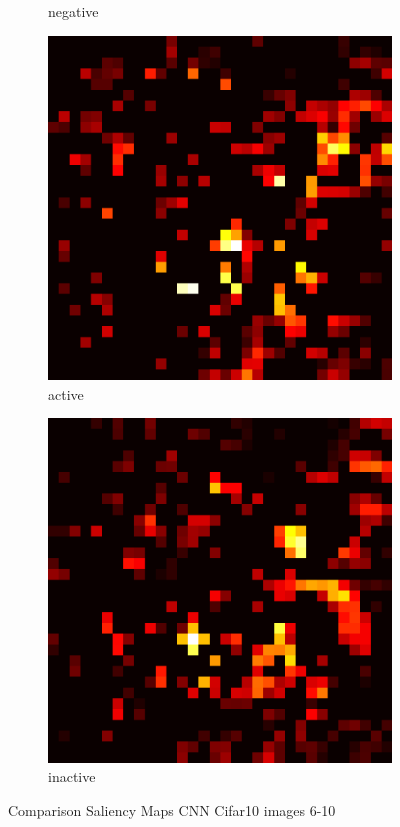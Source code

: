 \documentclass[preprint,12pt]{elsarticle}
\begin{document}
\begin{figure}
\begin{subfigure}{0.14\textwidth}
        \caption{negative}
    \end{subfigure}
    \hfill
    \begin{subfigure}{0.14\textwidth}
        \centering
        \includegraphics[width=\linewidth]{../visualizations/examples/cifar10/cnn/active_saliency_map/9.png}
        \caption{active}
    \end{subfigure}
    \hfill
    \begin{subfigure}{0.14\textwidth}
        \centering
        \includegraphics[width=\linewidth]{../visualizations/examples/cifar10/cnn/inactive_saliency_map/9.png}
        \caption{inactive}
    \end{subfigure}
    \hfill
    \caption{Comparison Saliency Maps CNN Cifar10 images 6-10}
\end{figure}
\end{document}
